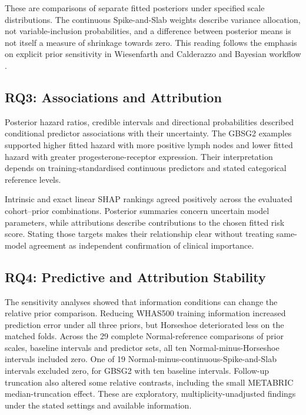 These are comparisons of separate fitted posteriors under specified scale distributions. The continuous Spike-and-Slab weights describe variance allocation, not variable-inclusion probabilities, and a difference between posterior means is not itself a measure of shrinkage towards zero. This reading follows the emphasis on explicit prior sensitivity in Wiesenfarth and Calderazzo \cite{ref56} and Bayesian workflow \cite{ref53}.

\subsection{RQ3: Associations and Attribution}\label{rq3-posterior-explainability}

Posterior hazard ratios, credible intervals and directional probabilities described conditional predictor associations with their uncertainty. The GBSG2 examples supported higher fitted hazard with more positive lymph nodes and lower fitted hazard with greater progesterone-receptor expression. Their interpretation depends on training-standardised continuous predictors and stated categorical reference levels.

Intrinsic and exact linear SHAP rankings agreed positively across the evaluated cohort--prior combinations. Posterior summaries concern uncertain model parameters, while attributions describe contributions to the chosen fitted risk score. Stating those targets makes their relationship clear without treating same-model agreement as independent confirmation of clinical importance.

\subsection{RQ4: Predictive and Attribution Stability}\label{rq4-robustness}

The sensitivity analyses showed that information conditions can change the relative prior comparison. Reducing WHAS500 training information increased prediction error under all three priors, but Horseshoe deteriorated less on the matched folds. Across the 29 complete Normal-reference comparisons of prior scales, baseline intervals and predictor sets, all ten Normal-minus-Horseshoe intervals included zero. One of 19 Normal-minus-continuous-Spike-and-Slab intervals excluded zero, for GBSG2 with ten baseline intervals. Follow-up truncation also altered some relative contrasts, including the small METABRIC median-truncation effect. These are exploratory, multiplicity-unadjusted findings under the stated settings and available information.

